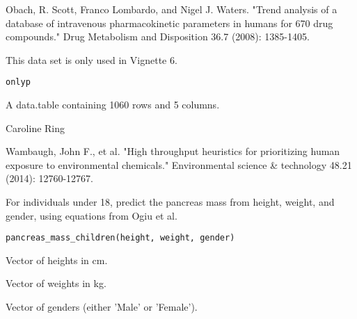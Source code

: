 \documentclass[a4paper]{book}
\begin{document}
%
\begin{References}\relax
Obach, R. Scott, Franco Lombardo, and Nigel J. Waters. "Trend
analysis of a database of intravenous pharmacokinetic parameters in humans
for 670 drug compounds." Drug Metabolism and Disposition 36.7 (2008):
1385-1405.
\end{References}
%
\begin{Description}\relax
This data set is only used in Vignette 6.
\end{Description}
%
\begin{Usage}
\begin{verbatim}
onlyp
\end{verbatim}
\end{Usage}
%
\begin{Format}
A data.table containing 1060 rows and 5 columns.
\end{Format}
%
\begin{Author}\relax
Caroline Ring
\end{Author}
%
\begin{References}\relax
Wambaugh, John F., et al. "High throughput heuristics for prioritizing human
exposure to environmental chemicals." Environmental science \& technology
48.21 (2014): 12760-12767.
\end{References}
%
\begin{Description}\relax
For individuals under 18, predict the pancreas mass from height, weight, and
gender, using equations from Ogiu et al.
\end{Description}
%
\begin{Usage}
\begin{verbatim}
pancreas_mass_children(height, weight, gender)
\end{verbatim}
\end{Usage}
%
\begin{Arguments}
\begin{ldescription}
\item[\code{height}] Vector of heights in cm.

\item[\code{weight}] Vector of weights in kg.

\item[\code{gender}] Vector of genders (either 'Male' or 'Female').
\end{ldescription}
\end{Arguments}
\end{document}
